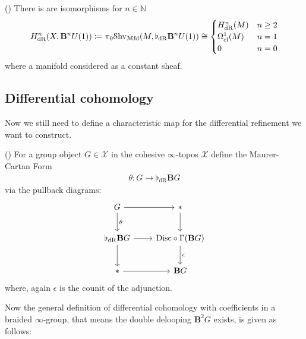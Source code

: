 \documentclass[10pt]{amsart}
\begin{document}
\begin{proposition}
  (\cite[Prop. 4.4.50.]{schreiber2013cohesive})
  There is are isomorphisms for $n\in \mathbb{N}$
  \begin{align*}
    H_{\mathrm{dR}}^n(X,\mathbf{B}^nU(1)) \coloneqq
    \pi_0 \mathcal{S}\mathrm{hv}_{\mathcal{M}\mathrm{fd}} (M, \flat_{\mathrm{dR}}\mathbf{B}^nU(1)) \cong
    \begin{cases}
      H_{\mathrm{dR}}^n(M) & n \geq 2 \\
      \Omega_{\mathrm{cl}}^1(M) & n = 1\\
      0 & n = 0
    \end{cases}
  \end{align*}
  where a manifold considered as a constant sheaf.
\end{proposition}

\subsection{Differential cohomology}

Now we still need to define a characteristic map for the differential
refinement we want to construct.

\begin{definition}
  (\cite[Def. 3.9.29.]{schreiber2013cohesive})
  For a group object $G \in \mathcal{X}$ in the cohesive
  $\infty$-topos $\mathcal{X}$ define the Maurer-Cartan Form
  \begin{align*}
    \theta \colon G \rightarrow \flat_{\mathrm{dR}}\mathbf{B}G
  \end{align*}
  via the pullback diagrams:
  \begin{equation}
    \begin{tikzcd}[nodes in empty cells, column sep= 0.8cm, row sep=0.8cm]
      G
      \ar[r]
      \ar[d,"\theta"]
      &
      \ast
      \ar[d]
      \\
      \flat_{\mathrm{dR}}\mathbf{B}G
      \ar[r]
      \ar[d]
      &
      \mathrm{Disc}\circ \Gamma( \mathbf{B}G)
      \ar[d,"\epsilon"]
      \\
      \ast
      \ar[r]
      &
      \mathbf{B}G
    \end{tikzcd}
  \end{equation}
  where, again $\epsilon$ is the counit of the adjunction.
\end{definition}

Now the general definition of differential cohomology with
coefficients in a braided $\infty$-group, that means the double
delooping $\mathbf{B}^2G$ exists, is given as follows:
\end{document}
